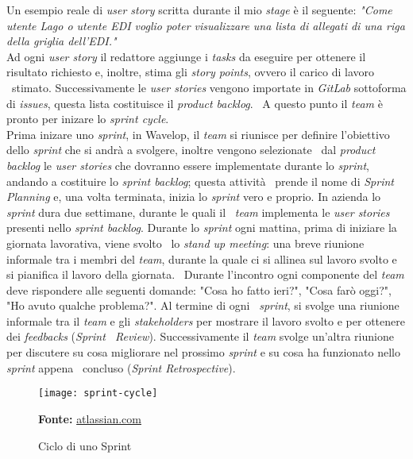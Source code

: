 Un esempio reale di \emph{user story} scritta durante il mio \emph{stage} è il seguente: 
\newline
\emph{"Come utente Lago o utente EDI voglio poter visualizzare una lista di allegati di una riga della griglia dell'EDI."} \\

Ad ogni \emph{user story} il redattore aggiunge i \emph{tasks} da eseguire per ottenere il risultato richiesto e, inoltre, stima gli \emph{story points}, ovvero il carico di lavoro \
stimato. Successivamente le \emph{user stories} vengono importate in \emph{GitLab} sottoforma di \emph{issues}, questa lista costituisce il \emph{product backlog}. \
A questo punto il \emph{team} è pronto per inizare lo \emph{sprint cycle}. \\

Prima inizare uno \emph{sprint}, in Wavelop, il \emph{team} si riunisce per definire l'obiettivo dello \emph{sprint} che si andrà a svolgere, inoltre vengono selezionate \
dal \emph{product backlog} le \emph{user stories} che dovranno essere implementate durante lo \emph{sprint}, andando a costituire lo \emph{sprint backlog}; questa attività \
prende il nome di \emph{Sprint Planning} e, una volta terminata, inizia lo \emph{sprint} vero e proprio. In azienda lo \emph{sprint} dura due settimane, durante le quali il \
\emph{team} implementa le \emph{user stories} presenti nello \emph{sprint backlog}. Durante lo \emph{sprint} ogni mattina, prima di iniziare la giornata lavorativa, viene svolto \
lo \emph{stand up meeting}: una breve riunione informale tra i membri del \emph{team}, durante la quale ci si allinea sul lavoro svolto e si pianifica il lavoro della giornata. \
Durante l'incontro ogni componente del \emph{team} deve rispondere alle seguenti domande: "Cosa ho fatto ieri?", "Cosa farò oggi?", "Ho avuto qualche problema?". Al termine di ogni \
\emph{sprint}, si svolge una riunione informale tra il \emph{team} e gli \emph{\glspl{stakeholder}} per mostrare il lavoro svolto e per ottenere dei \emph{feedbacks} (\emph{Sprint \
Review}). Successivamente il \emph{team} svolge un'altra riunione per discutere su cosa migliorare nel prossimo \emph{sprint} e su cosa ha funzionato nello \emph{sprint} appena \
concluso (\emph{Sprint Retrospective}). 

\begin{figure}[!ht]
  \begin{center}
    \texttt{[image: sprint-cycle]}
    \caption{Ciclo di uno Sprint}
    \textbf{Fonte:} \href{https://www.atlassian.com}{atlassian.com}
  \end{center}
\end{figure}

